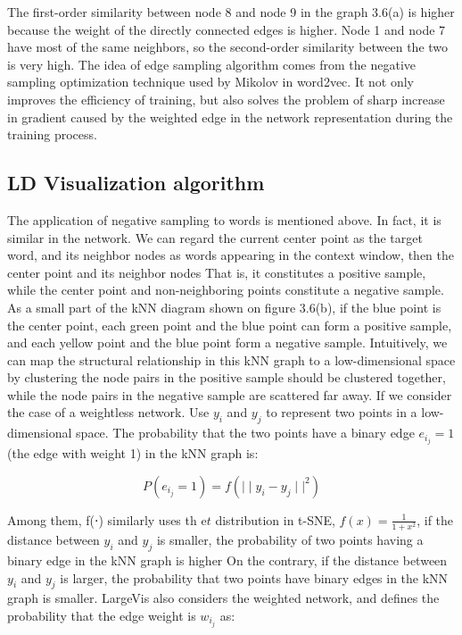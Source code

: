 \noindent The first-order similarity between node 8 and node 9 in the graph 3.6(a) is higher because the weight of the directly connected edges is higher. Node 1 and node 7 have most of the same neighbors, so the second-order similarity between the two is very high. The idea of edge sampling algorithm comes from the negative sampling optimization technique used by Mikolov in word2vec\cite{ref7}. It not only improves the efficiency of training, but also solves the problem of sharp increase in gradient caused by the weighted edge in the network representation during the training process.\\

\subsection{LD Visualization algorithm}

\noindent The application of negative sampling to words is mentioned above. In fact, it is similar in the network. We can regard the current center point as the target word, and its neighbor nodes as words appearing in the context window, then the center point and its neighbor nodes That is, it constitutes a positive sample, while the center point and non-neighboring points constitute a negative sample.\\

\noindent As a small part of the kNN diagram shown on figure 3.6(b), if the blue point is the center point, each green point and the blue point can form a positive sample, and each yellow point and the blue point form a negative sample. Intuitively, we can map the structural relationship in this kNN graph to a low-dimensional space by clustering the node pairs in the positive sample should be clustered together, while the node pairs in the negative sample are scattered far away. If we consider the case of a weightless network. Use $y_i$ and $y_j$ to represent two points in a low-dimensional space. The probability that the two points have a binary edge $e_i_j=1$ (the edge with weight 1) in the kNN graph is:

\begin{equation*}
    P(e_i_j = 1) = f( {\mid \mid y_i - y_j \mid \mid} ^ 2)
\end{equation*}

\noindent Among them, f(⋅) similarly uses th e$t$ distribution in t-SNE, $f(x)= \frac{1}{1+x^2}$, if the distance between $y_i$ and $y_j$ is smaller, the probability of two points having a binary edge in the kNN graph is higher On the contrary, if the distance between $y_i$ and $y_j$ is larger, the probability that two points have binary edges in the kNN graph is smaller. LargeVis also considers the weighted network, and defines the probability that the edge weight is $w_i_j$ as:

